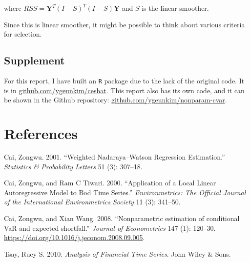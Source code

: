 \documentclass[
]{article}
\newlength{\cslhangindent}
\newenvironment{cslreferences}%
  {\setlength{\parindent}{0pt}%
  \everypar{\setlength{\hangindent}{\cslhangindent}}\ignorespaces}%
  {\par}
\theoremstyle{definition}
\theoremstyle{definition}
\theoremstyle{definition}
\theoremstyle{remark}
\begin{document}
where \(RSS = \mathbf{Y}^T(I - S)^T (I - S) \mathbf{Y}\) and \(S\) is the linear smoother.

Since this is linear smoother, it might be possible to think about various criteria for selection.

\hypertarget{supplement}{%
\subsection{Supplement}\label{supplement}}

For this report, I have built an \texttt{R} package due to the lack of the original code. It is in \href{https://github.com/ygeunkim/ceshat}{github.com/ygeunkim/ceshat}. This report also has its own code, and it can be shown in the Github repository: \href{https://github.com/ygeunkim/nonparam-cvar}{github.com/ygeunkim/nonparam-cvar}.

\newpage

\hypertarget{references}{%
\section*{References}\label{references}}

\hypertarget{refs}{}
\begin{cslreferences}
\leavevmode\hypertarget{ref-cai2001weighted}{}%
Cai, Zongwu. 2001. ``Weighted Nadaraya--Watson Regression Estimation.'' \emph{Statistics \& Probability Letters} 51 (3): 307--18.

\leavevmode\hypertarget{ref-cai2000application}{}%
Cai, Zongwu, and Ram C Tiwari. 2000. ``Application of a Local Linear Autoregressive Model to Bod Time Series.'' \emph{Environmetrics: The Official Journal of the International Environmetrics Society} 11 (3): 341--50.

\leavevmode\hypertarget{ref-cai:2008aa}{}%
Cai, Zongwu, and Xian Wang. 2008. ``Nonparametric estimation of conditional VaR and expected shortfall.'' \emph{Journal of Econometrics} 147 (1): 120--30. \url{https://doi.org/10.1016/j.jeconom.2008.09.005}.

\leavevmode\hypertarget{ref-Tsay:2010aa}{}%
Tsay, Ruey S. 2010. \emph{Analysis of Financial Time Series}. John Wiley \& Sons.
\end{cslreferences}
\end{document}
